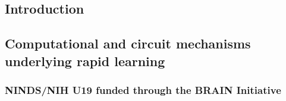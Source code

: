 \documentclass[a0, landscape]{a0poster}
\begin{document}
\begin{multicols}{3} %


\section*{Introduction}

\subsection*{Computational and circuit mechanisms underlying rapid learning}
\subsubsection*{NINDS/NIH U19 funded through the BRAIN Initiative}


\end{multicols}
\end{document}

